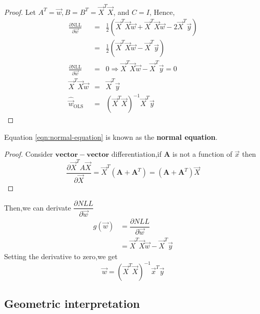 \begin{proof}
Let $A^T=\vec{w}, B=B^T=\vec{X}^T\vec{X}$, and $C=I$, Hence,
\begin{eqnarray}
\frac{\partial \text{NLL}}{\partial\vec{w}} &=& \frac{1}{2} (\vec{X}^T\vec{X}\vec{w}+\vec{X}^T\vec{X}\vec{w} -2\vec{X}^T\vec{y}) \nonumber \\
						   &=& \frac{1}{2} (\vec{X}^T\vec{X}\vec{w} - \vec{X}^T\vec{y}) \nonumber \\
\frac{\partial \text{NLL}}{\partial\vec{w}} &=& 0 \Rightarrow \vec{X}^T\vec{X}\vec{w} - \vec{X}^T\vec{y} =0 \nonumber \\
\vec{X}^T\vec{X}\vec{w} &=& \vec{X}^T\vec{y} \label{eqn:normal-equation} \\
\hat{\vec{w}}_{\mathrm{OLS}} &=& (\vec{X}^T\vec{X})^{-1}\vec{X}^T\vec{y} \nonumber
\end{eqnarray}
\end{proof}
Equation \ref{eqn:normal-equation} is known as the \textbf{normal equation}.
\begin{proof}
Consider $\mathbf{vector-vector}$ differentiation,if $\mathbf{A}$ is not a function of $\vec{x}$ then
\begin{equation}
\dfrac{\partial\vec{X}^TA\vec{X}}{\partial\vec{X}} = \vec{X}^T(\mathbf{A}+\mathbf{A}^T) = (\mathbf{A}+\mathbf{A}^T)\vec{X}
\end{equation}
\end{proof}
Then,we can derivate $\dfrac{\partial NLL}{\partial \vec{w}}$
\begin{eqnarray}
g(\vec{w}) &= \dfrac{\partial NLL}{\partial\vec{w}} \\
&=\vec{X}^T\vec{X}\vec{w} - \vec{X}^T\vec{y}			
\end{eqnarray}
Setting the derivative to zero,we get
\begin{equation}
	\vec{w} = (\vec{X}^T\vec{X})^{-1}\vec{x}^T\vec{y}
\end{equation}

\subsection{Geometric interpretation}

